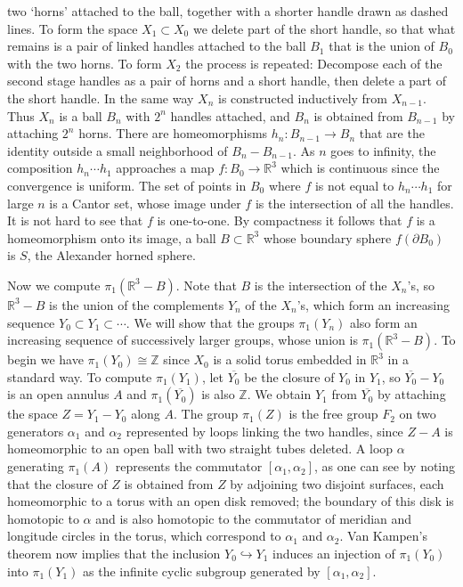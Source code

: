 two `horns' attached to the ball, together with a shorter handle drawn as dashed lines. To form the space $X_1 \subset X_0$ we delete part of the short handle, so that what remains is a pair of linked handles attached to the ball $B_1$ that is the union of $B_0$ with the two horns. To form $X_2$ the process is repeated: Decompose each of the second stage handles as a pair of horns and a short handle, then delete a part of the short handle. In the same way $X_n$ is constructed inductively from $X_{n-1}$. Thus $X_n$ is a ball $B_n$ with $2^n$ handles attached, and $B_n$ is obtained from $B_{n-1}$ by attaching $2^n$ horns. There are homeomorphisms $h_n : B_{n-1} \to B_n$ that are the identity outside a small neighborhood of $B_n - B_{n-1}$. As $n$ goes to infinity, the composition $h_n \cdots h_1$ approaches a map $f : B_0 \to \mathbb{R}^3$ which is continuous since the convergence is uniform. The set of points in $B_0$ where $f$ is not equal to $h_n \cdots h_1$ for large $n$ is a Cantor set, whose image under $f$ is the intersection of all the handles. It is not hard to see that $f$ is one-to-one. By compactness it follows that $f$ is a homeomorphism onto its image, a ball $B \subset \mathbb{R}^3$ whose boundary sphere $f(\partial B_0)$ is $S$, the Alexander horned sphere.



Now we compute $\pi_1(\mathbb{R}^3 - B)$. Note that $B$ is the intersection of the $X_n$'s, so $\mathbb{R}^3 - B$ is the union of the complements $Y_n$ of the $X_n$'s, which form an increasing sequence $Y_0 \subset Y_1 \subset \cdots$. We will show that the groups $\pi_1(Y_n)$ also form an increasing sequence of successively larger groups, whose union is $\pi_1(\mathbb{R}^3 - B)$. To begin we have $\pi_1(Y_0) \cong \mathbb{Z}$ since $X_0$ is a solid torus embedded in $\mathbb{R}^3$ in a standard way. To compute $\pi_1(Y_1)$, let $\overline{Y_0}$ be the closure of $Y_0$ in $Y_1$, so $\overline{Y_0} - Y_0$ is an open annulus $A$ and $\pi_1(\overline{Y_0})$ is also $\mathbb{Z}$. We obtain $Y_1$ from $\overline{Y_0}$ by attaching the space $Z = Y_1 - Y_0$ along $A$. The group $\pi_1(Z)$ is the free group $F_2$ on two generators $\alpha_1$ and $\alpha_2$ represented by loops linking the two handles, since $Z - A$ is homeomorphic to an open ball with two straight tubes deleted. A loop $\alpha$ generating $\pi_1(A)$ represents the commutator $[\alpha_1, \alpha_2]$, as one can see by noting that the closure of $Z$ is obtained from $Z$ by adjoining two disjoint surfaces, each homeomorphic to a torus with an open disk removed; the boundary of this disk is homotopic to $\alpha$ and is also homotopic to the commutator of meridian and longitude circles in the torus, which correspond to $\alpha_1$ and $\alpha_2$. Van Kampen's theorem now implies that the inclusion $Y_0 \hookrightarrow Y_1$ induces an injection of $\pi_1(Y_0)$ into $\pi_1(Y_1)$ as the infinite cyclic subgroup generated by $[\alpha_1, \alpha_2]$.

